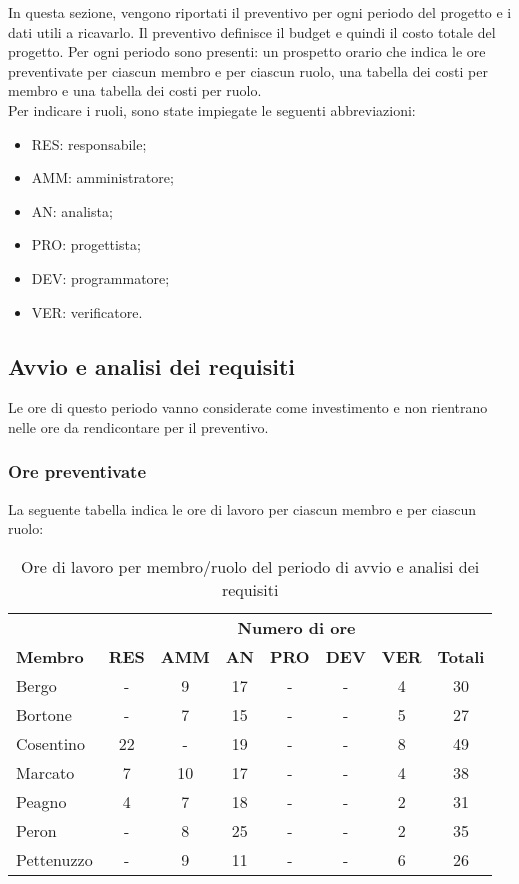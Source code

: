 In questa sezione, vengono riportati il preventivo per ogni periodo del progetto e i dati utili a ricavarlo. Il preventivo definisce il budget e quindi il costo totale del progetto. Per ogni periodo sono presenti: un prospetto orario che indica le ore preventivate per ciascun membro e per ciascun ruolo, una tabella dei costi per membro e una tabella dei costi per ruolo.\\
Per indicare i ruoli, sono state impiegate le seguenti abbreviazioni:
\begin{itemize}
	\item RES: responsabile;
	\item AMM: amministratore;
	\item AN: analista;
	\item PRO: progettista;
	\item DEV: programmatore;
	\item VER: verificatore.
\end{itemize}

\newpage
\subsection{Avvio e analisi dei requisiti}
	Le ore di questo periodo vanno considerate come investimento e non rientrano nelle ore da rendicontare per il preventivo.
	\subsubsection{Ore preventivate}
		La seguente tabella indica le ore di lavoro per ciascun membro e per ciascun ruolo:
		\begin{table}[h]
		\centering
		\begin{tabular}{| l | c c c c c c | c |}
			\rowcolor{LightBlue}
			& \multicolumn{7}{c}{\textbf{\color{white}Numero di ore}}	\\
	
			\rowcolor{LightBlue}
			\textbf{\color{white}Membro}
			& \textbf{\color{white}RES}
			& \textbf{\color{white}AMM}
			& \textbf{\color{white}AN}
			& \textbf{\color{white}PRO}
			& \textbf{\color{white}DEV}
			& \textbf{\color{white}VER}
			& \textbf{\color{white}Totali}\\
	
			Bergo 				& - & 9 & 17 & - & - & 4 & 30\\
			Bortone 			& - & 7 & 15	& - & - & 5 & 27\\
			Cosentino 		& 22 & - & 19 & - & - & 8 & 49\\
			Marcato 			& 7 & 10 & 17 & - & - & 4 & 38\\
			Peagno 			& 4 & 7 & 18 & - & - & 2 & 31\\
			Peron 				& - & 8 & 25 & - & - & 2 & 35\\
			Pettenuzzo 	& - & 9 & 11 & - & - & 6 & 26\\ \hline
		\end{tabular}
		\caption{Ore di lavoro per membro/ruolo del periodo di avvio e analisi dei requisiti}
		\end{table}
		
